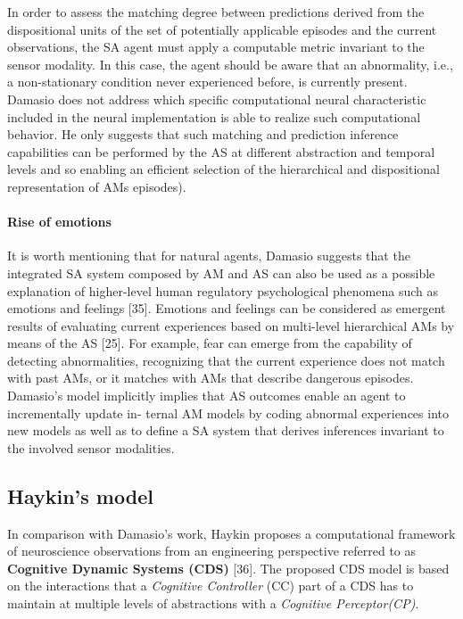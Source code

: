 \documentclass{article}
\begin{document}
			In order to assess the matching degree between
			predictions derived from the dispositional units of the set of
			potentially applicable episodes and the current observations,
			the SA agent must apply a computable metric invariant to the
			sensor modality. In this case, the agent should be aware that an
			abnormality, i.e., a non-stationary condition never experienced
			before, is currently present. Damasio does not address which
			specific computational neural characteristic included in the
			neural implementation is able to realize such computational
			behavior. He only suggests that such matching and prediction
			inference capabilities can be performed by the AS at different
			abstraction and temporal levels and so enabling an efficient
			selection of the hierarchical and dispositional representation
			of AMs episodes).
			\paragraph{Rise of emotions} It is worth mentioning that for natural agents, Damasio
			suggests that the integrated SA system composed by AM and
			AS can also be used as a possible explanation of higher-level
			human regulatory psychological phenomena such as emotions
			and feelings [35]. Emotions and feelings can be considered
			as emergent results of evaluating current experiences based
			on multi-level hierarchical AMs by means of the AS [25].
			For example, fear can emerge from the capability of detecting
			abnormalities, recognizing that the current experience does not
			match with past AMs, or it matches with AMs that describe
			dangerous episodes. Damasio’s model implicitly implies that
			AS outcomes enable an agent to incrementally update in-
			ternal AM models by coding abnormal experiences into new
			models as well as to define a SA system that derives inferences
			invariant to the involved sensor modalities.
			
			
		\subsection{Haykin’s model}
		
		In comparison with Damasio’s work, Haykin proposes a
		computational framework of neuroscience observations from
		an engineering perspective referred to as \textbf{Cognitive Dynamic
		Systems (CDS)} [36]. The proposed CDS model is based on the
		interactions that a \emph{Cognitive Controller} (CC) part of a CDS has
		to maintain at multiple levels of abstractions with a \emph{Cognitive Perceptor(CP)}. 
		
\end{document}
